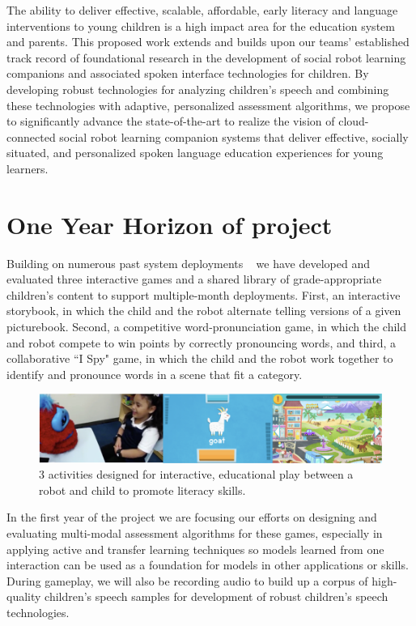 The ability to deliver effective, scalable, affordable, early literacy and language interventions to young children is a high impact area for the education system and parents. This proposed work extends and builds upon our teams' established track record of foundational research in the development of social robot learning companions and associated spoken interface technologies for children. By developing robust technologies for analyzing children's speech and combining these technologies with adaptive, personalized assessment algorithms, we propose to significantly advance the state-of-the-art to realize the vision of cloud-connected social robot learning companion systems that deliver effective, socially situated, and personalized spoken language education experiences for young learners.
\vspace{-4mm}   

\section{One Year Horizon of project}
\vspace{-3mm}   
Building on numerous past system deployments ~\cite{park2017hri-bc, gordon2016affective, westlund2017flat} we have developed and evaluated three interactive games and a shared library of grade-appropriate children's content to support multiple-month deployments. First, an interactive storybook, in which the child and the robot alternate telling versions of a given picturebook. Second, a competitive word-pronunciation game, in which the child and robot compete to win points by correctly pronouncing words, and third, a collaborative ``I Spy" game, in which the child and the robot work together to identify and pronounce words in a scene that fit a category.

\begin{figure}%
  \centering
  \includegraphics[width=.85\textwidth]{fig/game_screens.png}  
  \caption{3 activities designed for interactive, educational play between a robot and child to promote literacy skills.}
  \vspace{-4mm} 
  \label{fig:robots}
\end{figure}
In the first year of the project we are focusing our efforts on designing and evaluating multi-modal assessment algorithms for these games, especially in applying active and transfer learning techniques so models learned from one interaction can be used as a foundation for models in other applications or skills. During gameplay, we will also be recording audio to build up a corpus of high-quality children's speech samples for development of robust children's speech technologies.

